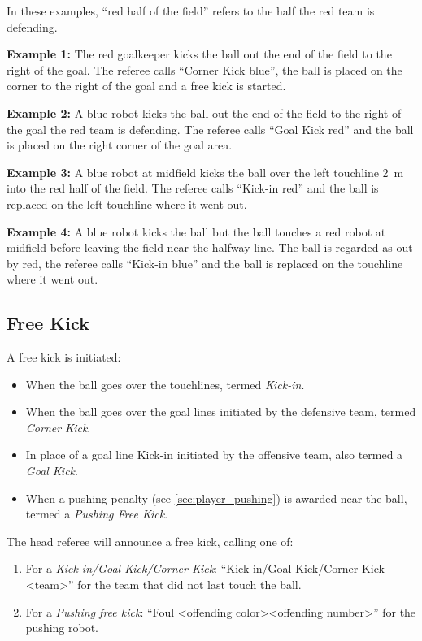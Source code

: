 In these examples, ``red half of the field'' refers to the half the red team is defending.

\textbf{Example 1:} The red goalkeeper kicks the ball out the end of the field to the right of the goal.
The referee calls ``Corner Kick blue'', the ball is placed on the corner to the right of the goal and a free kick is started.

\textbf{Example 2:} A blue robot kicks the ball out the end of the field to the right of the goal the red team is defending.
The referee calls ``Goal Kick red'' and the ball is placed on the right corner of the goal area.

\textbf{Example 3:} A blue robot at midfield kicks the ball over the left touchline \qty{2}{\metre} into the red half of the field.
The referee calls ``Kick-in red'' and the ball is replaced on the left touchline where it went out.

\textbf{Example 4:} A blue robot kicks the ball but the ball touches a red robot at midfield before leaving the field near the halfway line.
The ball is regarded as out by red, the referee calls ``Kick-in blue'' and the ball is replaced on the touchline where it went out.

\subsection{Free Kick}
\label{sec:free_kick}

A free kick is initiated:
\begin{itemize}
  \item When the ball goes over the touchlines, termed \emph{Kick-in}.
  \item When the ball goes over the goal lines initiated by the defensive team, termed \emph{Corner Kick}.
  \item In place of a goal line Kick-in initiated by the offensive team, also termed a \emph{Goal Kick}.
  \item When a pushing penalty (see \cref{sec:player_pushing}) is awarded near the ball, termed a \emph{Pushing Free Kick}.
\end{itemize}

The head referee will announce a free kick, calling one of:
\begin{enumerate}
  \item For a \textit{Kick-in/Goal Kick/Corner Kick}: ``Kick-in/Goal Kick/Corner Kick \textless team\textgreater'' for the team that did not last touch the ball.
  \item For a \textit{Pushing free kick}: ``Foul \textless offending color\textgreater \textless offending number\textgreater'' for the pushing robot.
\end{enumerate}

